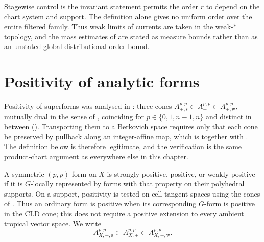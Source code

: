 \begin{warning}{Stagewise control is the invariant statement}
 permits the order $r$ to depend on
the chart system and support.  The definition alone gives no uniform order
over the entire filtered family.  Thus weak limits of currents are taken in
the weak-$*$ topology, and the mass estimates of
 are stated as measure bounds rather than as an
unstated global distributional-order bound.
\end{warning}

\section{Positivity of analytic forms}
\label{sec:ch13-positivity}

Positivity of superforms was analysed in
: three cones
$A^{p,p}_{+,\mathrm s}\subset A^{p,p}_+\subset A^{p,p}_{+,\mathrm w}$,
mutually dual in the sense of , coinciding
for $p\in\{0,1,n-1,n\}$ and distinct in between
().  Transporting
them to a Berkovich space requires only that each cone be preserved by
pullback along an integer-affine map, which is
 together with
.  The definition below is therefore
legitimate, and the verification is the same product-chart argument as
everywhere else in this chapter.

\begin{definition}
\label{def:ch13-positivity}
A symmetric $(p,p)$-form on $X$ is strongly positive, positive, or weakly
positive if it is $G$-locally represented by forms with that property
on their polyhedral supports.  On a support, positivity is tested on
cell tangent spaces using the cones of .
Thus an ordinary form is positive when its corresponding $G$-form is
positive in the CLD cone; this does not require a positive extension to
every ambient tropical vector space.  We write
\[
 A_{X,+,\mathrm{s}}^{p,p}\subset
 A_{X,+}^{p,p}\subset
 A_{X,+,\mathrm{w}}^{p,p}.
\]
\end{definition}


